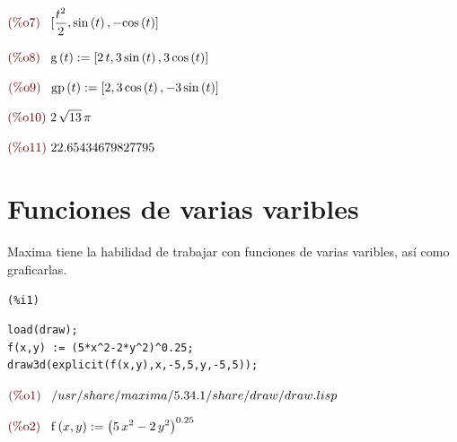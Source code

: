 \documentclass[12pt]{article}
\begin{document}
\begin{math}\displaystyle
\parbox{8ex}{\color{labelcolor}(\%o7) }
[\frac{{t}^{2}}{2},\mathrm{sin}\left( t\right) ,-\mathrm{cos}\left( t\right) ]
\end{math}

\begin{math}\displaystyle
\parbox{8ex}{\color{labelcolor}(\%o8) }
\mathrm{g}\left( t\right) :=[2\,t,3\,\mathrm{sin}\left( t\right) ,3\,\mathrm{cos}\left( t\right) ]
\end{math}

\begin{math}\displaystyle
\parbox{8ex}{\color{labelcolor}(\%o9) }
\mathrm{gp}\left( t\right) :=[2,3\,\mathrm{cos}\left( t\right) ,-3\,\mathrm{sin}\left( t\right) ]
\end{math}

\begin{math}\displaystyle
\parbox{8ex}{\color{labelcolor}(\%o10) }
2\,\sqrt{13}\,\pi 
\end{math}

\begin{math}\displaystyle
\parbox{8ex}{\color{labelcolor}(\%o11) }
22.65434679827795
\end{math}
\section{Funciones de varias varibles}
Maxima tiene la habilidad de trabajar con funciones de varias varibles, así como graficarlas.
\noindent
\begin{minipage}[t]{8ex}{\color{red}\bf
\begin{verbatim}
(%i1) 
\end{verbatim}}
\end{minipage}
\begin{minipage}[t]{\textwidth}{\color{blue}
\begin{verbatim}
load(draw);
f(x,y) := (5*x^2-2*y^2)^0.25;
draw3d(explicit(f(x,y),x,-5,5,y,-5,5));
\end{verbatim}}
\end{minipage}

\begin{math}\displaystyle
\parbox{8ex}{\color{labelcolor}(\%o1) }
/usr/share/maxima/5.34.1/share/draw/draw.lisp
\end{math}

\begin{math}\displaystyle
\parbox{8ex}{\color{labelcolor}(\%o2) }
\mathrm{f}\left( x,y\right) :={\left( 5\,{x}^{2}-2\,{y}^{2}\right) }^{0.25}
\end{math}
\end{document}
